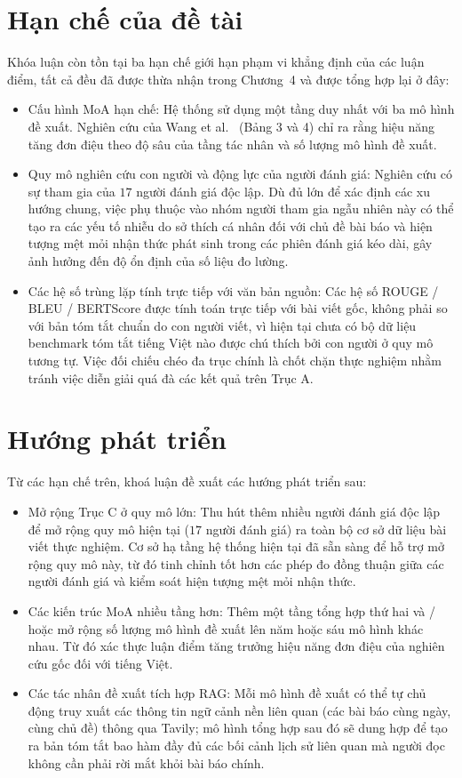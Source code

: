 \section{Hạn chế của đề tài}

Khóa luận còn tồn tại ba hạn chế giới hạn phạm vi khẳng định của các luận điểm, tất cả đều đã được thừa nhận trong Chương~4 và được tổng hợp lại ở đây:
\begin{itemize}
  \item Cấu hình MoA hạn chế: Hệ thống sử dụng một tầng duy nhất với ba mô hình đề xuất. Nghiên cứu của Wang et al.\ \cite{Wang2024} (Bảng 3 và 4) chỉ ra rằng hiệu năng tăng đơn điệu theo độ sâu của tầng tác nhân và số lượng mô hình đề xuất.
  \item Quy mô nghiên cứu con người và động lực của người đánh giá: Nghiên cứu có sự tham gia của $17$ người đánh giá độc lập. Dù đủ lớn để xác định các xu hướng chung, việc phụ thuộc vào nhóm người tham gia ngẫu nhiên này có thể tạo ra các yếu tố nhiễu do sở thích cá nhân đối với chủ đề bài báo và hiện tượng mệt mỏi nhận thức phát sinh trong các phiên đánh giá kéo dài, gây ảnh hưởng đến độ ổn định của số liệu đo lường.
  \item Các hệ số trùng lặp tính trực tiếp với văn bản nguồn: Các hệ số ROUGE / BLEU / BERTScore được tính toán trực tiếp với bài viết gốc, không phải so với bản tóm tắt chuẩn do con người viết, vì hiện tại chưa có bộ dữ liệu benchmark tóm tắt tiếng Việt nào được chú thích bởi con người ở quy mô tương tự. Việc đối chiếu chéo đa trục chính là chốt chặn thực nghiệm nhằm tránh việc diễn giải quá đà các kết quả trên Trục A.
\end{itemize}

\section{Hướng phát triển}

Từ các hạn chế trên, khoá luận đề xuất các hướng phát triển sau:
  
\begin{itemize}
  \item Mở rộng Trục C ở quy mô lớn: Thu hút thêm nhiều người đánh giá độc lập để mở rộng quy mô hiện tại ($17$ người đánh giá) ra toàn bộ cơ sở dữ liệu bài viết thực nghiệm. Cơ sở hạ tầng hệ thống hiện tại đã sẵn sàng để hỗ trợ mở rộng quy mô này, từ đó tinh chỉnh tốt hơn các phép đo đồng thuận giữa các người đánh giá và kiểm soát hiện tượng mệt mỏi nhận thức.
  \item Các kiến trúc MoA nhiều tầng hơn: Thêm một tầng tổng hợp thứ hai và / hoặc mở rộng số lượng mô hình đề xuất lên năm hoặc sáu mô hình khác nhau. Từ đó xác thực luận điểm tăng trưởng hiệu năng đơn điệu của nghiên cứu gốc \cite{Wang2024} đối với tiếng Việt.
  \item Các tác nhân đề xuất tích hợp RAG: Mỗi mô hình đề xuất có thể tự chủ động truy xuất các thông tin ngữ cảnh nền liên quan (các bài báo cùng ngày, cùng chủ đề) thông qua Tavily; mô hình tổng hợp sau đó sẽ dung hợp để tạo ra bản tóm tắt bao hàm đầy đủ các bối cảnh lịch sử liên quan mà người đọc không cần phải rời mắt khỏi bài báo chính.
\end{itemize}

\vspace{0.6em}
